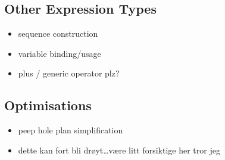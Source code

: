 \subsection{Other Expression Types}
\label{sect:translation:ll:OtherExpr}
\begin{itemize}
  \item sequence construction
  \item variable binding/usage
  \item plus / generic operator plz?
\end{itemize}

\subsection{Optimisations}
\label{sect:translation:ll:Optimisations}
\begin{itemize}
  \item peep hole plan simplification
  \item dette kan fort bli dr\o yt\ldots v\ae re litt forsiktige her tror jeg
\end{itemize}

